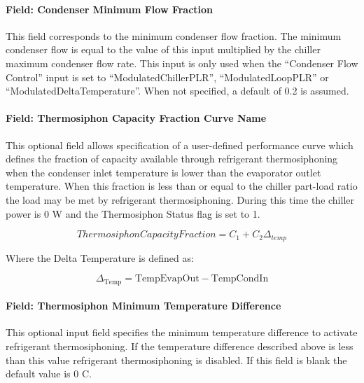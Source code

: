 \paragraph{Field: Condenser Minimum Flow Fraction}

This field corresponds to the minimum condenser flow fraction. The minimum condenser flow is equal to the value of this input multiplied by the chiller maximum condenser flow rate. This input is only used when the ``Condenser Flow Control'' input is set to ``ModulatedChillerPLR'', ``ModulatedLoopPLR'' or ``ModulatedDeltaTemperature''. When not specified, a default of 0.2 is assumed.

\paragraph{Field: Thermosiphon Capacity Fraction Curve Name}\label{thermosiphon-capacity-fraction-curve-name4}

This optional field allows specification of a user-defined performance curve which defines the fraction of capacity available through refrigerant thermosiphoning when the condenser inlet temperature is lower than the evaporator outlet temperature. When this fraction is less than or equal to the chiller part-load ratio the load may be met by refrigerant thermosiphoning. During this time the chiller power is 0 W and the Thermosiphon Status flag is set to 1.

\begin{equation}
    ThermosiphonCapacityFraction = {C_1} + {C_2}{\Delta_{temp}}
\end{equation}

Where the Delta Temperature is defined as:

\begin{equation}
{\Delta_{{\mathrm{Temp}}}}
    = {\mathrm{TempEvapOut  -  TempCondIn }}
\end{equation}

\paragraph{Field: Thermosiphon Minimum Temperature Difference}\label{thermosiphon-minimum-temperature-difference4}

This optional input field specifies the minimum temperature difference to activate refrigerant thermosiphoning. If the temperature difference described above is less than this value refrigerant thermosiphoning is disabled. If this field is blank the default value is 0 C.


